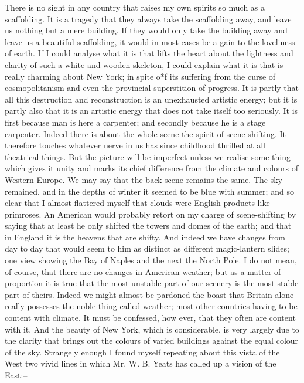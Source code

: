 \documentclass{book}
\begin{document}
There is no sight in any country that raises my own spirits so much as a scaffolding. It is a tragedy that they always take the scaffolding away, and leave us nothing but a mere building. If they would only take the building away and leave us a beautiful scaffolding, it would in most cases be a gain to the loveliness of earth. If I could analyse what it is that lifts the heart about the lightness and clarity of such a white and wooden skeleton, I could explain what it is that is really charming about New York; in spite o*f its suffering from the curse of cosmopolitanism and even the provincial superstition of progress. It is partly that all this destruction and reconstruction is an unexhausted artistic energy; but it is partly also that it is an artistic energy that does not take itself too seriously. It is first because man is here a carpenter; and secondly because he is a stage carpenter. Indeed there is about the whole scene the spirit of scene-shifting. It therefore touches whatever nerve in us has since childhood thrilled at all theatrical things. But the picture will be imperfect unless we realise some thing which gives it unity and marks its chief difference from the climate and colours of Western Europe. We may say that the back-scene remains the same. The sky remained, and in the depths of winter it seemed to be blue with summer; and so clear that I almost flattered myself that clouds were English products like primroses. An American would probably retort on my charge of scene-shifting by saying that at least he only shifted the towers and domes of the earth; and that in England it is the heavens that are shifty. And indeed we have changes from day to day that would seem to him as distinct as different magic-lantern slides; one view showing the Bay of Naples and the next the North Pole. I do not mean, of course, that there are no changes in American weather; but as a matter of proportion it is true that the most unstable part of our scenery is the most stable part of theirs. Indeed we might almost be pardoned the boast that Britain alone really possesses the noble thing called weather; most other countries having to be content with climate. It must be confessed, how ever, that they often are content with it. And the beauty of New York, which is considerable, is very largely due to the clarity that brings out the colours of varied buildings against the equal colour of the sky. Strangely enough I found myself repeating about this vista of the West two vivid lines in which Mr. W. B. Yeats has called up a vision of the East:–
\end{document}
